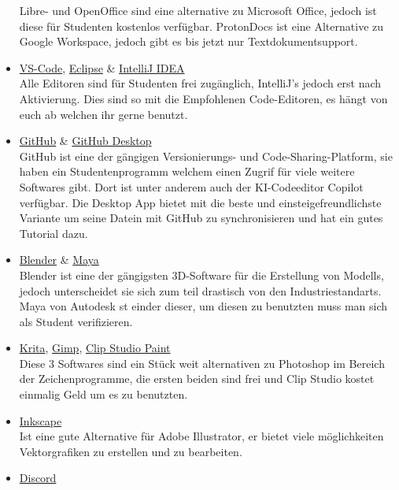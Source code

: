 \begin{itemize}
    Libre- und OpenOffice sind eine alternative zu Microsoft Office, jedoch ist diese für Studenten kostenlos verfügbar. ProtonDocs ist eine Alternative zu Google Workspace, jedoch gibt es bis jetzt nur Textdokumentsupport. 
    \item \href{https://code.visualstudio.com/download}{VS-Code}, \href{https://www.eclipse.org/downloads/}{Eclipse} \& \href{https://www.jetbrains.com/idea/}{IntelliJ IDEA}\\ Alle Editoren sind für Studenten frei zugänglich, IntelliJ's jedoch erst nach Aktivierung. Dies sind so mit die Empfohlenen Code-Editoren, es hängt von euch ab welchen ihr gerne benutzt.
    \item \href{https://education.github.com/discount_requests/application}{GitHub} \& \href{https://desktop.github.com/download/}{GitHub Desktop}\\
    GitHub ist eine der gängigen Versionierungs- und Code-Sharing-Platform, sie haben ein Studentenprogramm welchem einen Zugrif für viele weitere Softwares gibt. Dort ist unter anderem auch der KI-Codeeditor Copilot verfügbar. Die Desktop App bietet mit die beste und einsteigefreundlichste Variante um seine Datein mit GitHub zu synchronisieren und hat ein gutes Tutorial dazu.
    \item \href{https://www.blender.org/}{Blender} \& \href{https://manage.autodesk.com/products/maya}{Maya}\\
    Blender ist eine der gängigsten 3D-Software für die Erstellung von Modells, jedoch unterscheidet sie sich zum teil drastisch von den Industriestandarts. Maya von Autodesk st einder dieser, um diesen zu benutzten muss man sich als Student verifizieren.
    \item \href{https://krita.org/de/download/}{Krita}, \href{https://krita.org/de/download/}{Gimp}, \href{https://www.clipstudio.net/de/dl/}{Clip Studio Paint}\\
    Diese 3 Softwares sind ein Stück weit alternativen zu Photoshop im Bereich der Zeichenprogramme, die ersten beiden sind frei und Clip Studio kostet einmalig Geld um es zu benutzten.
    \item \href{https://inkscape.org/release/inkscape-1.3.2/windows/64-bit/msi/?redirected=1}{Inkscape}\\ Ist eine gute Alternative für Adobe Illustrator, er bietet viele möglichkeiten Vektorgrafiken zu erstellen und zu bearbeiten.
    \item \href{https://discord.com/download}{Discord}\\

\end{itemize}
